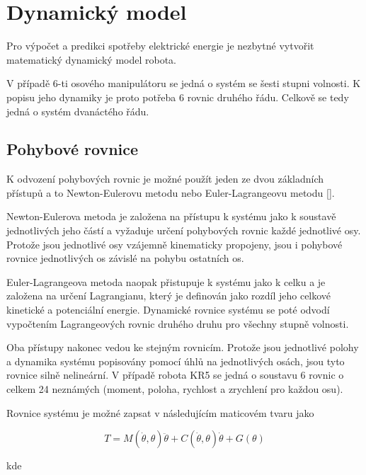 

\chapter{Dynamický model}

Pro výpočet a predikci spotřeby elektrické energie je nezbytné vytvořit matematický dynamický model robota. 

V případě 6-ti osového manipulátoru se jedná o systém se šesti stupni volnosti. K popisu jeho dynamiky je proto potřeba 6 rovnic druhého řádu. Celkově se tedy jedná o systém dvanáctého řádu. 

\section{Pohybové rovnice}
\label{pohybove_rovnice_sec}
K odvození pohybových rovnic je možné použít jeden ze dvou základních přístupů a to Newton-Eulerovu metodu nebo Euler-Lagrangeovu metodu [\cite{rob_mod_control}]. 

Newton-Eulerova metoda je založena na přístupu k systému jako k soustavě jednotlivých jeho částí a vyžaduje určení pohybových rovnic každé jednotlivé osy. Protože jsou jednotlivé osy vzájemně kinematicky propojeny, jsou i pohybové rovnice jednotlivých os závislé na pohybu ostatních os. 

Euler-Lagrangeova metoda naopak přistupuje k systému jako k celku a je založena na určení Lagrangianu, který je definován jako rozdíl jeho celkové kinetické a potenciální energie. Dynamické rovnice systému se poté odvodí vypočtením Lagrangeových rovnic druhého druhu pro všechny stupně volnosti.

Oba přístupy nakonec vedou ke stejným rovnicím. Protože jsou jednotlivé polohy a dynamika systému popisovány pomocí úhlů na jednotlivých osách, jsou tyto rovnice silně nelineární. V případě robota KR5 se jedná o soustavu 6 rovnic o celkem 24 neznámých (moment, poloha, rychlost a zrychlení pro každou osu). 

Rovnice systému je možné zapsat v následujícím maticovém tvaru jako 

\begin{equation}
T = M(\dot{\theta},\theta)\ddot{\theta} + C(\dot{\theta},\theta)\dot{\theta} + G(\theta)
\label{dyn_rovnice_eq}
\end{equation}

kde

